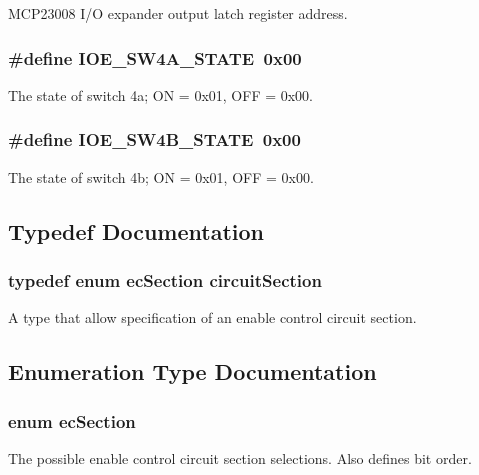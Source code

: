 M\-C\-P23008 I/\-O expander output latch register address. \hypertarget{a00023_a0cfe7137edc026282b36312077954701}{
\subsubsection[{I\-O\-E\-\_\-\-S\-W4\-A\-\_\-\-S\-T\-A\-T\-E}]{\setlength{\rightskip}{0pt plus 5cm}\#define I\-O\-E\-\_\-\-S\-W4\-A\-\_\-\-S\-T\-A\-T\-E~0x00}}\label{a00023_a0cfe7137edc026282b36312077954701}
The state of switch 4a; O\-N = 0x01, O\-F\-F = 0x00. \hypertarget{a00023_a5704aece7ac84dbd34e918fc0c60108d}{
\subsubsection[{I\-O\-E\-\_\-\-S\-W4\-B\-\_\-\-S\-T\-A\-T\-E}]{\setlength{\rightskip}{0pt plus 5cm}\#define I\-O\-E\-\_\-\-S\-W4\-B\-\_\-\-S\-T\-A\-T\-E~0x00}}\label{a00023_a5704aece7ac84dbd34e918fc0c60108d}
The state of switch 4b; O\-N = 0x01, O\-F\-F = 0x00. 

\subsection{Typedef Documentation}
\hypertarget{a00023_a5d2cb2e2fccefcdcb2e72e9e88b94223}{
\subsubsection[{circuit\-Section}]{\setlength{\rightskip}{0pt plus 5cm}typedef enum {\bf ec\-Section} {\bf circuit\-Section}}}\label{a00023_a5d2cb2e2fccefcdcb2e72e9e88b94223}
A type that allow specification of an enable control circuit section. 

\subsection{Enumeration Type Documentation}
\hypertarget{a00023_a693dd7ac614cd1a7f8bfd7440f34ed6f}{
\subsubsection[{ec\-Section}]{\setlength{\rightskip}{0pt plus 5cm}enum {\bf ec\-Section}}}\label{a00023_a693dd7ac614cd1a7f8bfd7440f34ed6f}
The possible enable control circuit section selections. Also defines bit order. 

